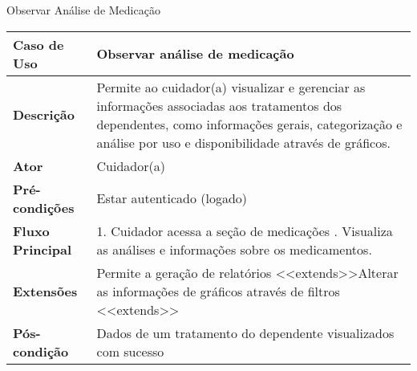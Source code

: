 \begin{quadro}
    \caption{\label{quadro_observar_analise_medicacao}Observar Análise de Medicação}
    \begin{tabular}{|l|p{12cm}|}
        \hline
        \textbf{Caso de Uso} & Observar análise de medicação \\ \hline
        \textbf{Descrição} & Permite ao cuidador(a) visualizar e gerenciar as informações associadas aos tratamentos dos dependentes, como informações gerais, categorização e análise por uso e disponibilidade através de gráficos. \\ \hline
        \textbf{Ator} & Cuidador(a) \\ \hline
        \textbf{Pré-condições} & Estar autenticado (logado) \\ \hline
        \textbf{Fluxo Principal} & 1. Cuidador acessa a seção de medicações \newline 2. Visualiza as análises e informações sobre os medicamentos. \\ \hline
        \textbf{Extensões} & Permite a geração de relatórios \textless\textless extends\textgreater\textgreater \newline Alterar as informações de gráficos através de filtros \textless\textless extends\textgreater\textgreater \\ \hline
        \textbf{Pós-condição} & Dados de um tratamento do dependente visualizados com sucesso \\ \hline
    \end{tabular}
\end{quadro}

